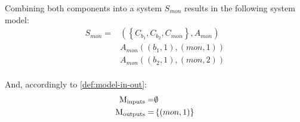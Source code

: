 Combining both components into a system $S_{mon}$ results in the following system model:
\begin{align*}
S_{mon} = & \left(\left\{ C_{b_1}, C_{b_2}, C_{mon} \right\}, A_{mon} \right) \\
& A_{mon}\left(\left(b_1, 1\right), \left(mon, 1\right) \right) \\
& A_{mon}\left(\left(b_2, 1\right), \left(mon, 2\right) \right) \\
\end{align*}

And, accordingly to \cref{def:model-in-out}:
\begin{align*}
\mathrm{M_{inputs}} =& \emptyset \\
\mathrm{M_{outputs}} =& \left\{ \left(mon, 1\right) \right\}
\end{align*}


